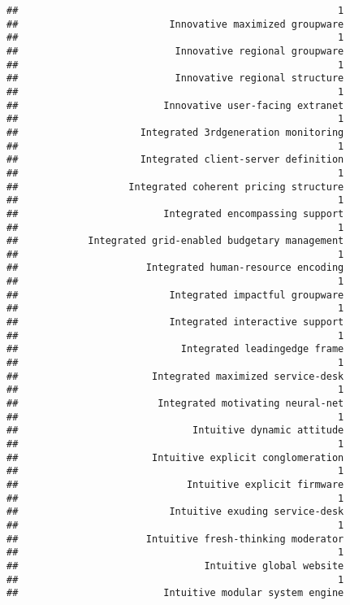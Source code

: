 \documentclass[
]{article}
\begin{document}
\begin{verbatim}
##                                                       1 
##                          Innovative maximized groupware 
##                                                       1 
##                           Innovative regional groupware 
##                                                       1 
##                           Innovative regional structure 
##                                                       1 
##                         Innovative user-facing extranet 
##                                                       1 
##                     Integrated 3rdgeneration monitoring 
##                                                       1 
##                     Integrated client-server definition 
##                                                       1 
##                   Integrated coherent pricing structure 
##                                                       1 
##                         Integrated encompassing support 
##                                                       1 
##            Integrated grid-enabled budgetary management 
##                                                       1 
##                      Integrated human-resource encoding 
##                                                       1 
##                          Integrated impactful groupware 
##                                                       1 
##                          Integrated interactive support 
##                                                       1 
##                            Integrated leadingedge frame 
##                                                       1 
##                       Integrated maximized service-desk 
##                                                       1 
##                        Integrated motivating neural-net 
##                                                       1 
##                              Intuitive dynamic attitude 
##                                                       1 
##                       Intuitive explicit conglomeration 
##                                                       1 
##                             Intuitive explicit firmware 
##                                                       1 
##                          Intuitive exuding service-desk 
##                                                       1 
##                      Intuitive fresh-thinking moderator 
##                                                       1 
##                                Intuitive global website 
##                                                       1 
##                         Intuitive modular system engine 

\end{verbatim}
\end{document}
